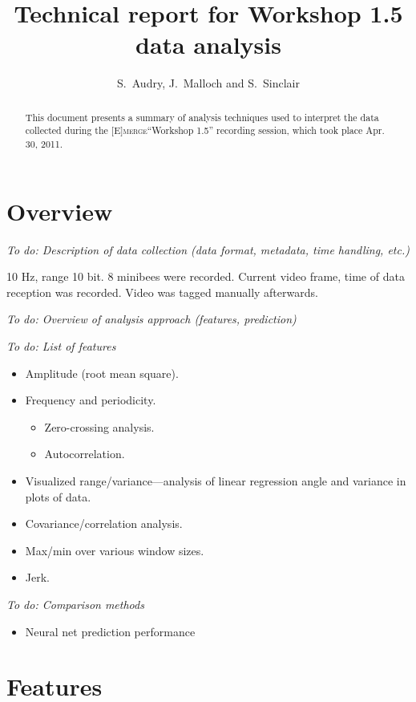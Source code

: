 \documentclass{article}
\title{Technical report for Workshop 1.5 data analysis}
\author{S.~Audry, J.~Malloch and S.~Sinclair}
\newcommand{\emerge}{\textsc{[E]merge}\xspace}
\newcommand{\todo}[1]{\emph{To do: #1}}
\begin{document}
\maketitle

\begin{abstract}
This document presents a summary of analysis techniques used to
interpret the data collected during the \emerge ``Workshop 1.5''
recording session, which took place Apr. 30, 2011.
\end{abstract}

\section{Overview}

\todo{Description of data collection (data format, metadata, time handling, etc.)}

10 Hz, range 10 bit.  8 minibees were recorded.  Current video frame,
time of data reception was recorded.  Video was tagged manually
afterwards.

\todo{Overview of analysis approach (features, prediction)}

\todo{List of features}

\begin{itemize}
  \item Amplitude (root mean square).
  \item Frequency and periodicity.
    \begin{itemize}
    \item Zero-crossing analysis.
    \item Autocorrelation.
    \end{itemize}
  \item Visualized range/variance---analysis of linear regression
    angle and variance in plots of data.
  \item Covariance/correlation analysis.
  \item Max/min over various window sizes.
  \item Jerk.
\end{itemize}

\todo{Comparison methods}

\begin{itemize}
  \item Neural net prediction performance
\end{itemize}

\section{Features}
\end{document}
